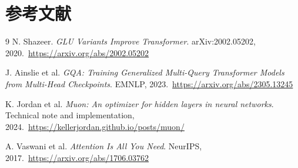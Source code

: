 \documentclass[UTF8,a4paper,11pt]{ctexart}
\begin{document}
\section*{参考文献}
\begin{thebibliography}{9}
N. Shazeer. \emph{GLU Variants Improve Transformer}. arXiv:2002.05202, 2020.\
\url{https://arxiv.org/abs/2002.05202}

J. Ainslie et al. \emph{GQA: Training Generalized Multi-Query Transformer Models from Multi-Head Checkpoints}. EMNLP, 2023.\
\url{https://arxiv.org/abs/2305.13245}

K. Jordan et al. \emph{Muon: An optimizer for hidden layers in neural networks}. Technical note and implementation, 2024.\
\url{https://kellerjordan.github.io/posts/muon/}

\bibitem{gpt}
A. Vaswani et al. \emph{Attention Is All You Need}. NeurIPS, 2017.\
\url{https://arxiv.org/abs/1706.03762}
\end{thebibliography}
\end{document}

